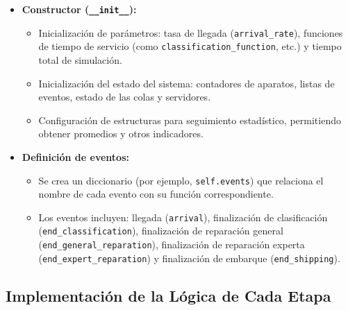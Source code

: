 \documentclass[a4paper,12pt]{article}
\begin{document}
\begin{itemize}[leftmargin=2cm]
    \item \textbf{Constructor (\texttt{\_\_init\_\_}):}
    \begin{itemize}
        \item Inicialización de parámetros: tasa de llegada (\texttt{arrival\_rate}), funciones de tiempo de servicio (como \texttt{classification\_function}, etc.) y tiempo total de simulación.
        \item Inicialización del estado del sistema: contadores de aparatos, listas de eventos, estado de las colas y servidores.
        \item Configuración de estructuras para seguimiento estadístico, permitiendo obtener promedios y otros indicadores.
    \end{itemize}
    \item \textbf{Definición de eventos:}
    \begin{itemize}
        \item Se crea un diccionario (por ejemplo, \texttt{self.events}) que relaciona el nombre de cada evento con su función correspondiente.
        \item Los eventos incluyen: llegada (\texttt{arrival}), finalización de clasificación (\texttt{end\_classification}), finalización de reparación general (\texttt{end\_general\_reparation}), finalización de reparación experta (\texttt{end\_expert\_reparation}) y finalización de embarque (\texttt{end\_shipping}).
    \end{itemize}
\end{itemize}

\subsection{Implementación de la Lógica de Cada Etapa}
\end{document}
